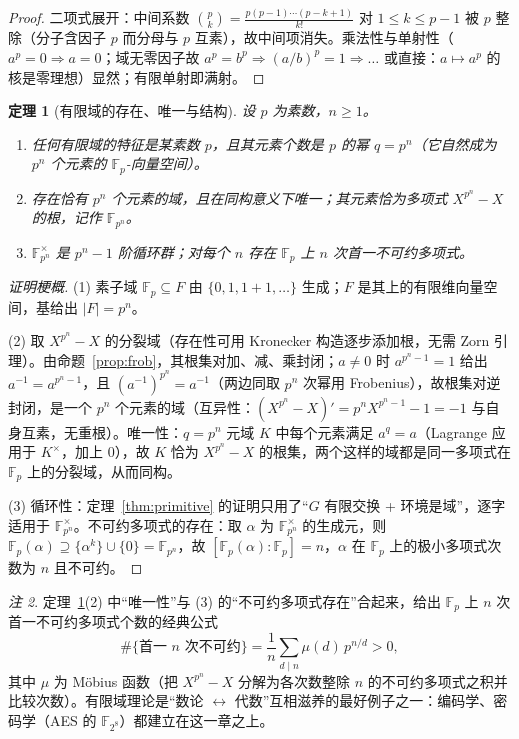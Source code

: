 \documentclass[a4paper,11pt]{ctexart}
\numberwithin{equation}{section}
\theoremstyle{plain}
\newtheorem{theorem}{定理}[section]
\theoremstyle{definition}
\theoremstyle{remark}
\newtheorem{remark}[theorem]{注}
\newcommand{\F}{\mathbb{F}}
\begin{document}
\begin{proof}
二项式展开：中间系数 $\binom{p}{k}=\frac{p(p-1)\cdots(p-k+1)}{k!}$ 对 $1\le k\le p-1$ 被 $p$ 整除（分子含因子 $p$ 而分母与 $p$ 互素），故中间项消失。乘法性与单射性（$a^p=0\Rightarrow a=0$；域无零因子故 $a^p=b^p\Rightarrow (a/b)^p=1\Rightarrow \dots$ 或直接：$a\mapsto a^p$ 的核是零理想）显然；有限单射即满射。
\end{proof}

\begin{theorem}[有限域的存在、唯一与结构]\label{thm:finfield}
设 $p$ 为素数，$n\ge1$。
\begin{enumerate}[itemsep=0.1em]
  \item 任何有限域的特征是某素数 $p$，且其元素个数是 $p$ 的幂 $q=p^n$（它自然成为 $p^n$ 个元素的 $\F_p$-向量空间）。
  \item 存在恰有 $p^n$ 个元素的域，且在同构意义下唯一；其元素恰为多项式 $X^{p^n}-X$ 的根，记作 $\F_{p^n}$。
  \item $\F_{p^n}^{\times}$ 是 $p^n-1$ 阶循环群；对每个 $n$ 存在 $\F_p$ 上 $n$ 次首一不可约多项式。
\end{enumerate}
\end{theorem}

\begin{proof}[证明梗概]
(1) 素子域 $\F_p\subseteq F$ 由 $\{0,1,1+1,\dots\}$ 生成；$F$ 是其上的有限维向量空间，基给出 $|F|=p^n$。

(2) 取 $X^{p^n}-X$ 的分裂域（存在性可用 Kronecker 构造逐步添加根，无需 Zorn 引理）。由命题~\ref{prop:frob}，其根集对加、减、乘封闭；$a\neq0$ 时 $a^{p^n-1}=1$ 给出 $a^{-1}=a^{p^n-1}$，且 $(a^{-1})^{p^n}=a^{-1}$（两边同取 $p^n$ 次幂用 Frobenius），故根集对逆封闭，是一个 $p^n$ 个元素的域（互异性：$(X^{p^n}-X)'=p^nX^{p^n-1}-1=-1$ 与自身互素，无重根）。唯一性：$q=p^n$ 元域 $K$ 中每个元素满足 $a^q=a$（Lagrange 应用于 $K^{\times}$，加上 $0$），故 $K$ 恰为 $X^{p^n}-X$ 的根集，两个这样的域都是同一多项式在 $\F_p$ 上的分裂域，从而同构。

(3) 循环性：定理~\ref{thm:primitive} 的证明只用了“$G$ 有限交换 + 环境是域”，逐字适用于 $\F_{p^n}^{\times}$。不可约多项式的存在：取 $\alpha$ 为 $\F_{p^n}^{\times}$ 的生成元，则 $\F_p(\alpha)\supseteq\{\alpha^k\}\cup\{0\}=\F_{p^n}$，故 $[\F_p(\alpha):\F_p]=n$，$\alpha$ 在 $\F_p$ 上的极小多项式次数为 $n$ 且不可约。
\end{proof}

\begin{remark}
定理~\ref{thm:finfield}(2) 中“唯一性”与 (3) 的“不可约多项式存在”合起来，给出 $\F_p$ 上 $n$ 次首一不可约多项式个数的经典公式
\[
\#\{\text{首一 } n \text{ 次不可约}\}=\frac1n\sum_{d\mid n}\mu(d)\,p^{n/d}>0 ,
\]
其中 $\mu$ 为 Möbius 函数（把 $X^{p^n}-X$ 分解为各次数整除 $n$ 的不可约多项式之积并比较次数）。有限域理论是“数论 $\leftrightarrow$ 代数”互相滋养的最好例子之一：编码学、密码学（AES 的 $\F_{2^8}$）都建立在这一章之上。
\end{remark}
\end{document}
